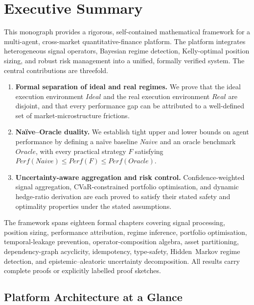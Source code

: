 \documentclass[12pt,openany]{book}
\numberwithin{equation}{chapter}
\theoremstyle{plain}
\theoremstyle{definition}
\theoremstyle{remark}
\newenvironment{executivesummary}{%
  \chapter*{Executive Summary}
}{%
}
\numberwithin{equation}{chapter}
\theoremstyle{plain}
\newcommand{\Ideal}{\mathcal{E}_{I}}
\newcommand{\Real}{\mathcal{E}_{R}}
\newcommand{\Naive}{N}
\newcommand{\Oracle}{O}
\newcommand{\Perf}{\mathrm{Perf}}
\def\Naive{Naive}%
\def\Oracle{Oracle}%
\def\Ideal{Ideal}%
\def\Real{Real}%
\def\Perf{Perf}%
\begin{document}
\begin{executivesummary}
\label{ch:exec-summary}

This monograph provides a rigorous, self-contained mathematical framework
for a multi-agent, cross-market quantitative-finance platform.  The
platform integrates heterogeneous signal operators, Bayesian regime
detection, Kelly-optimal position sizing, and robust risk management
into a unified, formally verified system.  The central contributions
are threefold.

\begin{enumerate}
  \item \textbf{Formal separation of ideal and real regimes.}  We prove
        that the ideal execution environment $\Ideal$ and the real
        execution environment $\Real$ are disjoint, and that every
        performance gap can be attributed to a well-defined set of
        market-microstructure frictions.

  \item \textbf{Na\"ive--Oracle duality.}  We establish tight upper and
        lower bounds on agent performance by defining a na\"ive baseline
        $\Naive$ and an oracle benchmark $\Oracle$, with every
        practical strategy $F$ satisfying
        $\Perf(\Naive) \le \Perf(F) \le \Perf(\Oracle)$.

  \item \textbf{Uncertainty-aware aggregation and risk control.}
        Confidence-weighted signal aggregation, CVaR-constrained
        portfolio optimisation, and dynamic hedge-ratio derivation
        are each proved to satisfy their stated safety and optimality
        properties under the stated assumptions.
\end{enumerate}

The framework spans eighteen formal chapters covering signal processing,
position sizing, performance attribution, regime inference, portfolio
optimisation, temporal-leakage prevention, operator-composition algebra,
asset partitioning, dependency-graph acyclicity, idempotency,
type-safety, Hidden~Markov regime detection, and epistemic--aleatoric
uncertainty decomposition.  All results carry complete proofs or
explicitly labelled proof sketches.

\section*{Platform Architecture at a Glance}


\end{executivesummary}
\end{document}
